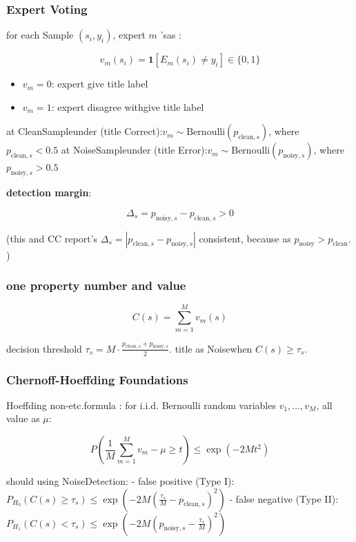 \documentclass[
  12pt,
]{article}
\providecommand{\tightlist}{%
  \setlength{\itemsep}{0pt}\setlength{\parskip}{0pt}}
\begin{document}
\subsubsection{Expert Voting}\label{ux4e13ux5bb6ux6295ux7968}

for each Sample \((s_i, y_i)\), expert  \(m\) 'sas : 

\[v_m(s_i) = \mathbf{1}[E_m(s_i) \neq y_i] \in \{0, 1\}\]

\begin{itemize}
\tightlist
\item
  \(v_m = 0\): expert give title label
\item
  \(v_m = 1\): expert disagree withgive title label
\end{itemize}

at CleanSampleunder (title Correct):\(v_m \sim \text{Bernoulli}(p_{\text{clean}, s})\), where
\(p_{\text{clean}, s} < 0.5\)
at NoiseSampleunder (title Error):\(v_m \sim \text{Bernoulli}(p_{\text{noisy}, s})\), where
\(p_{\text{noisy}, s} > 0.5\)

\textbf{detection margin}: 

\[\boxed{\Delta_s = p_{\text{noisy}, s} - p_{\text{clean}, s} > 0}\]

(this and  CC report's
\(\Delta_s = |p_{\text{clean},s} - p_{\text{noisy},s}|\) consistent, because as 
\(p_{\text{noisy}} > p_{\text{clean}}\). )

\subsubsection{one property number and value }\label{ux4e00ux81f4ux6027ux8ba1ux6570ux4e0eux9608ux503c}

\[C(s) = \sum_{m=1}^{M} v_m(s)\]

decision threshold 
\(\tau_s = M \cdot \frac{p_{\text{clean},s} + p_{\text{noisy},s}}{2}\). title as Noisewhen 
\(C(s) \geq \tau_s\). 

\subsubsection{Chernoff-Hoeffding
Foundations}\label{chernoff-hoeffding-ux57faux7840}

Hoeffding non-etc.formula : for  i.i.d. Bernoulli random variables 
\(v_1, \ldots, v_M\), all value as  \(\mu\): 

\[P\left(\frac{1}{M}\sum_{m=1}^{M} v_m - \mu \geq t\right) \leq \exp(-2M t^2)\]

should using NoiseDetection:  - false positive (Type
I):\(P_{H_0}(C(s) \geq \tau_s) \leq \exp\left(-2M\left(\frac{\tau_s}{M} - p_{\text{clean},s}\right)^2\right)\)
- false negative (Type
II):\(P_{H_1}(C(s) < \tau_s) \leq \exp\left(-2M\left(p_{\text{noisy},s} - \frac{\tau_s}{M}\right)^2\right)\)
\end{document}
